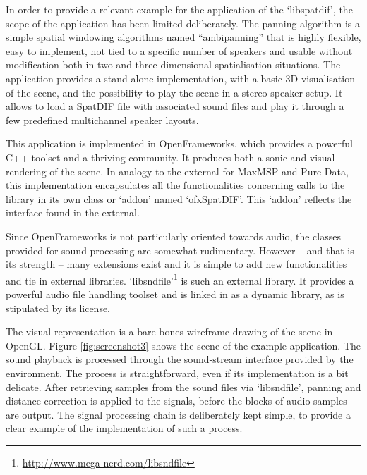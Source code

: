 \documentclass{article}
\begin{document}
In order to provide a relevant example for the application of the `libspatdif', the scope of the application has been limited deliberately.
The panning algorithm is a simple spatial windowing algorithms named ``ambipanning'' \cite{Neukom:2008ambipan} that is highly flexible, easy to implement, not tied to a specific number of speakers and usable without modification both in two and three dimensional spatialisation situations.
The application provides a stand-alone implementation, with a basic 3D visualisation of the scene, and the possibility to play the scene in a stereo speaker setup.
It allows to load a SpatDIF file with associated sound files and play it through a few predefined multichannel speaker layouts.

This application is implemented in OpenFrameworks, which provides a powerful C++ toolset and a thriving community.
It produces both a sonic and visual rendering of the scene.
In analogy to the external for MaxMSP and Pure Data, this implementation encapsulates all the functionalities concerning calls to the library in its own class or `addon' named `ofxSpatDIF'.
This `addon' reflects the interface found in the external.

Since OpenFrameworks is not particularly oriented towards audio, the classes provided for sound processing are somewhat rudimentary.
However -- and that is its strength -- many extensions exist and it is simple to add new functionalities and tie in external libraries.
`libsndfile'\footnote{\url{http://www.mega-nerd.com/libsndfile}} is such an external library. 
It provides a powerful audio file handling toolset and is linked in as a dynamic library, as is stipulated by its license.

The visual representation is a bare-bones wireframe drawing of the scene in OpenGL.
Figure \ref{fig:screenshot3} shows the scene of the example application.
The sound playback is processed through the sound-stream interface provided by the environment.
The process is straightforward, even if its implementation is a bit delicate.
After retrieving samples from the sound files via `libsndfile', panning and distance correction is applied to the signals, before the blocks of audio-samples are output.
The signal processing chain is deliberately kept simple, to provide a clear example of the implementation of such a process.
\end{document}
